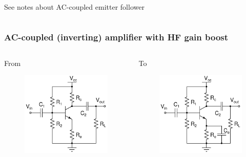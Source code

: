 \documentclass[beamer]{standalone}
\begin{document}
{\begin{columns}[c]
\begin{column}
  \pause
  See notes about AC-coupled emitter follower

 \end{column}
\end{columns}
 
 }

\begin{frame}
\frametitle{AC-coupled (inverting) amplifier with HF gain boost}
\begin{columns}[t]
 \begin{column}{.45\textwidth}
  From
  \begin{figure}
   \includegraphics[height=0.50\textheight]{./schematics/npn_ac_common_emitter_amplifier}
  \end{figure}
 \end{column}
 \begin{column}{.45\textwidth}
  To
  \begin{figure}
   \includegraphics[height=0.50\textheight]{./schematics/npn_ac_common_emitter_amplifier_with_ac_boost}

\end{figure}
\end{column}
\end{columns}
\end{frame}
\end{document}
